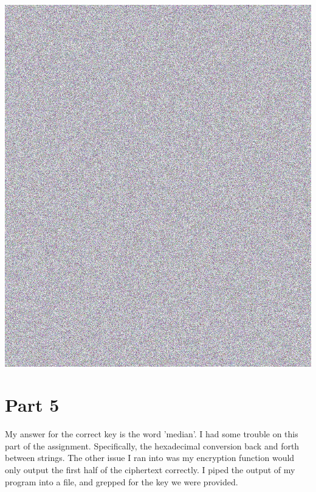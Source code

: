 \documentclass[10pt,letterpaper]{article}
\begin{document}
\includegraphics[scale=.1]{cbctux.png}

\section*{Part 5}
My answer for the correct key is the word 'median'. I had some trouble on this part of the assignment.
Specifically, the hexadecimal conversion back and forth between strings. The other issue
I ran into was
my encryption function would only output the first half of the ciphertext correctly. I
piped the output of my program into a file, and grepped for the key we were provided.
\end{document}
